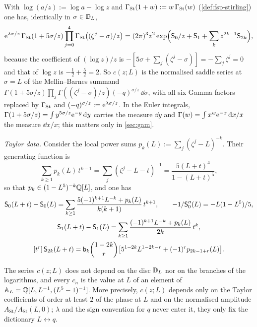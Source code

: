 With $\log(a/z):=\log a-\log z$ and $\Gamma_{\mathrm{St}}(1+w):=w\,\Gamma_{\mathrm{St}}(w)$ (\cref{def:fsp-stirling}) one has, identically in $\sigma\in\mathbb{D}_L$,
\[
\mathrm{e}^{\lambda\sigma/z}\,\Gamma_{\mathrm{St}}(1+5\sigma/z)\prod_{j=0}^4\Gamma_{\mathrm{St}}\bigl((\zeta^j-\sigma)/z\bigr)=(2\pi)^3z^2\exp\Bigl(\mathsf S_0/z+\mathsf S_1+\sum_kz^{2k-1}\mathsf S_{2k}\Bigr),
\]
because the coefficient of $(\log z)/z$ is $-[5\sigma+\sum_j(\zeta^j-\sigma)]=-\sum_j\zeta^j=0$ and that of $\log z$ is $-\frac12+\frac52=2$. So $c(z;L)$ is the normalised saddle series at $\sigma=L$ of the Mellin--Barnes summand $\Gamma(1+5\sigma/z)\prod_j\Gamma((\zeta^j-\sigma)/z)(-q)^{\sigma/z}\,\dd\sigma$, with all six Gamma factors replaced by $\Gamma_{\mathrm{St}}$ and $(-q)^{\sigma/z}:=\mathrm{e}^{\lambda\sigma/z}$. In the Euler integrals, $\Gamma(1+5\sigma/z)=\int y^{5\sigma/z}\mathrm{e}^{-y}\,\mathrm{d} y$ carries the measure $\dd y$ and $\Gamma(w)=\int x^w\mathrm{e}^{-x}\,\mathrm{d} x/x$ the measure $\dd x/x$; this matters only in \cref{sec:gam}.

\emph{Taylor data.} Consider the local power sums $p_k(L):=\sum_j(\zeta^j-L)^{-k}$. Their generating function is
\[
\sum_{k\geq1}p_k(L)\,t^{k-1}=\sum_j(\zeta^j-L-t)^{-1}=\frac{5(L+t)^4}{1-(L+t)^5},
\]
so that $p_k\in(1-L^5)^{-k}\mathbb{Q}[L]$, and one has
\begin{gather*}
\mathsf S_0(L+t)-\mathsf S_0(L)=\sum_{k\geq1}\frac{5(-1)^{k+1}L^{-k}+p_k(L)}{k(k+1)}\,t^{k+1},\qquad
-1/\mathsf S_0''(L)=-L(1-L^5)/5,\\
\mathsf S_1(L+t)-\mathsf S_1(L)=\sum_{k\geq1}\frac{(-1)^{k+1}L^{-k}+p_k(L)}{2k}\,t^{k},\\
[t^r]\,\mathsf S_{2k}(L+t)=\mathsf{b}_k\binom{1-2k}{r}\bigl[5^{1-2k}L^{1-2k-r}+(-1)^rp_{2k-1+r}(L)\bigr].
\end{gather*}

\begin{prop}[Rationality]
\label{prop:gam-rational}
The series $c(z;L)$ does not depend on the disc $\mathbb{D}_L$ nor on the branches of the logarithms, and every $c_n$ is the value at $L$ of an element of $\mathbb{A}_{L}=\mathbb{Q}[L,L^{-1},(L^5-1)^{-1}]$. More precisely, $c(z;L)$ depends only on the Taylor coefficients of order at least $2$ of the phase at $L$ and on the normalised amplitude $A_{\mathrm{St}}/A_{\mathrm{St}}(L,0)$; $\lambda$ and the sign convention for $q$ never enter it, they only fix the dictionary $L\leftrightarrow q$.
\end{prop}

